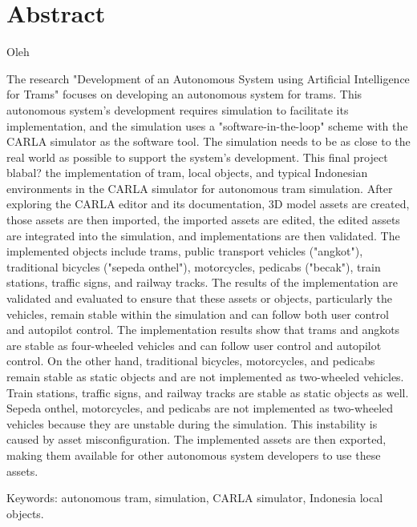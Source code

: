 \chapter*{Abstract}

\begin{center}
	\center
	\begin{onehalfspace}
		\Large \bfseries \MakeUppercase{\thetitleinenglish}

		\normalfont \normalsize
		Oleh

		\theauthor
	\end{onehalfspace}
\end{center}

\begin{singlespace}
	The research "Development of an Autonomous System using Artificial
	Intelligence for Trams" focuses on developing an autonomous system for
	trams. This autonomous system's development requires simulation to
	facilitate its implementation, and the simulation uses a
	"software-in-the-loop" scheme with the CARLA simulator as the software tool.
	The simulation needs to be as close to the real world as possible to support
	the system's development. This final project blabal? the implementation of
	tram, local objects, and typical Indonesian environments in the CARLA
	simulator for autonomous tram simulation. After exploring the CARLA editor
	and its documentation, 3D model assets are created, those assets are then
	imported, the imported assets are edited, the edited assets are integrated
	into the simulation, and implementations are then validated. The implemented
	objects include trams, public transport vehicles ("angkot"), traditional
	bicycles ("sepeda onthel"), motorcycles, pedicabs ("becak"), train stations,
	traffic signs, and railway tracks. The results of the implementation are
	validated and evaluated to ensure that these assets or objects, particularly
	the vehicles, remain stable within the simulation and can follow both user
	control and autopilot control. The implementation results show that trams
	and angkots are stable as four-wheeled vehicles and can follow user control
	and autopilot control. On the other hand, traditional bicycles, motorcycles,
	and pedicabs remain stable as static objects and are not implemented as
	two-wheeled vehicles. Train stations, traffic signs, and railway tracks are
	stable as static objects as well. Sepeda onthel, motorcycles, and pedicabs
	are not implemented as two-wheeled vehicles because they are unstable during
	the simulation. This instability is caused by asset misconfiguration. The
	implemented assets are then exported, making them available for other
	autonomous system developers to use these assets.

	Keywords: autonomous tram, simulation, CARLA simulator, Indonesia local
	objects.
\end{singlespace}

\clearpage
